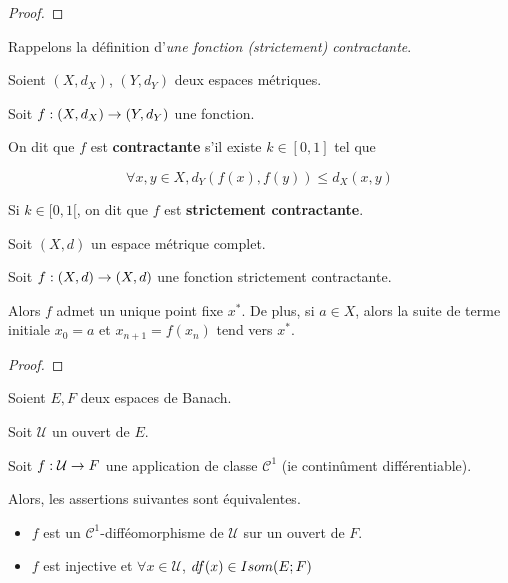 \ifdefined\outputproof
\begin{proof}

\end{proof}
\fi

Rappelons la définition d'\textit{une fonction (strictement) contractante}.

\begin{definition}
	Soient $(X, d_{X})$, $(Y, d_{Y})$ deux espaces métriques.

	Soit $f : (X, d_{X}) \rightarrow (Y, d_{Y})$ une fonction.

	On dit que $f$ est \textbf{contractante} s'il existe $k \in [0, 1]$ tel que

	\begin{equation*}
		\forall x, y \in X, d_{Y}(f(x), f(y)) \leq d_{X}(x, y)
	\end{equation*}

	Si $k \in [0, 1[$, on dit que $f$  est \textbf{strictement contractante}.
\end{definition}

\begin{theorem} 
	\label{theorem:point_fixe_banach}
	Soit $(X, d)$ un espace métrique complet.

	Soit $f : (X, d) \rightarrow (X, d)$ une fonction strictement contractante.

	Alors $f$ admet un unique point fixe $x^{*}$.
	De plus, si $a \in X$, alors la suite de terme initiale $x_{0} = a$ et $x_{n
	+ 1} = f(x_{n})$ tend vers $x^{*}$.
\end{theorem}

\ifdefined\outputproof
\begin{proof}

\end{proof}
\fi


\begin{theorem}
	\label{theorem:inversion_globale}
	Soient $E, F$ deux espaces de Banach.

	Soit $\mathcal{U}$ un ouvert de $E$.

	Soit $f : \mathcal{U} \rightarrow F$ une application de classe
	$\mathcal{C}^{1}$ (ie continûment différentiable).

	Alors, les assertions suivantes sont équivalentes.

	\begin{itemize}
		\item $f$ est un $\mathcal{C}^{1}$-difféomorphisme de $\mathcal{U}$ sur
			un ouvert de $F$.
		\item $f$ est injective et $\forall x \in \mathcal{U}$, $df(x) \in
			Isom(E; F)$
	\end{itemize}
\end{theorem}

